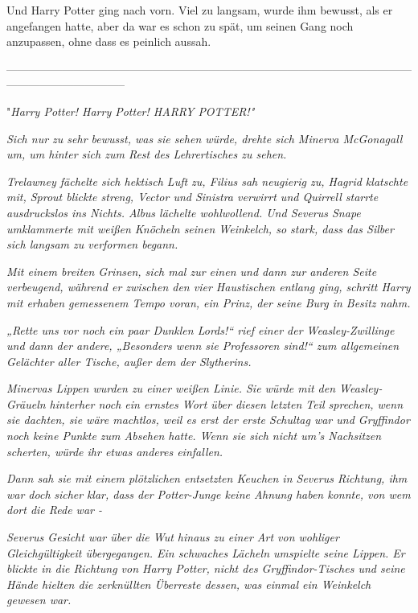 {Und Harry Potter ging nach vorn. Viel zu langsam, wurde ihm bewusst, als er angefangen hatte, aber da war es schon zu spät, um seinen Gang noch anzupassen, ohne dass es peinlich aussah.

--------------------------------------------------------------------------------------------------------------------------------------------

\hfill\break "\emph{Harry Potter! Harry Potter! HARRY POTTER!"}

\emph{Sich nur zu sehr bewusst, was sie sehen würde, drehte sich Minerva McGonagall um, um hinter sich zum Rest des Lehrertisches zu sehen.}

\emph{Trelawney fächelte sich hektisch Luft zu, Filius sah neugierig zu, Hagrid klatschte mit, Sprout blickte streng, Vector und Sinistra verwirrt und Quirrell starrte ausdruckslos ins Nichts. Albus lächelte wohlwollend. Und Severus Snape umklammerte mit weißen Knöcheln seinen Weinkelch, so stark, dass das Silber sich langsam zu verformen begann.}

\emph{Mit einem breiten Grinsen, sich mal zur einen und dann zur anderen Seite verbeugend, während er zwischen den vier Haustischen entlang ging, schritt Harry mit erhaben gemessenem Tempo voran, ein Prinz, der seine Burg in Besitz nahm.}

\emph{„\emph{Rette uns vor noch ein paar Dunklen Lords!}“ rief einer der Weasley-Zwillinge und dann der andere, „\emph{Besonders wenn sie Professoren sind!}“ zum allgemeinen Gelächter aller Tische, außer dem der Slytherins.}

\emph{Minervas Lippen wurden zu einer weißen Linie. Sie würde mit den Weasley-Gräueln hinterher noch ein ernstes Wort über diesen letzten Teil sprechen, wenn sie dachten, sie wäre machtlos, weil es erst der erste Schultag war und Gryffindor noch keine Punkte zum Absehen hatte. Wenn sie sich nicht um's Nachsitzen scherten, würde ihr etwas anderes einfallen.}

\emph{Dann sah sie mit einem plötzlichen entsetzten Keuchen in Severus Richtung, ihm war doch} \emph{\emph{sicher}} \emph{klar, dass der Potter-Junge keine Ahnung haben konnte, von wem dort die Rede war -}

\emph{Severus Gesicht war über die Wut hinaus zu einer Art von wohliger Gleichgültigkeit übergegangen. Ein schwaches Lächeln umspielte seine Lippen. Er blickte in die Richtung von Harry Potter, nicht des Gryffindor-Tisches und seine Hände hielten die zerknüllten Überreste dessen, was einmal ein Weinkelch gewesen war.}

}
